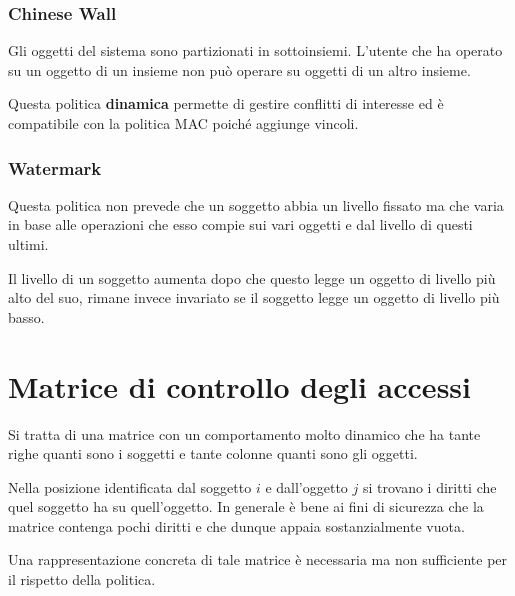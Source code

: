 \subsubsection{Chinese Wall}
Gli oggetti del sistema sono partizionati in sottoinsiemi. L'utente che ha operato su un oggetto di un insieme non
può operare su oggetti di un altro insieme.

Questa politica \textbf{dinamica} permette di gestire conflitti di interesse ed è compatibile con la politica MAC
poiché aggiunge vincoli.

\subsubsection{Watermark}
Questa politica non prevede che un soggetto abbia un livello fissato ma che varia in base alle operazioni che esso
compie sui vari oggetti e dal livello di questi ultimi.

Il livello di un soggetto aumenta dopo che questo legge un oggetto di livello più alto del suo, rimane invece invariato
se il soggetto legge un oggetto di livello più basso.

\section{Matrice di controllo degli accessi}
Si tratta di una matrice con un comportamento molto dinamico che ha tante righe quanti sono i soggetti e tante colonne
quanti sono gli oggetti.

Nella posizione identificata dal soggetto $i$ e dall'oggetto $j$ si trovano i diritti che quel soggetto ha su
quell'oggetto. In generale è bene ai fini di sicurezza che la matrice contenga pochi diritti e che dunque appaia
sostanzialmente vuota.

Una rappresentazione concreta di tale matrice è necessaria ma non sufficiente per il rispetto della politica.